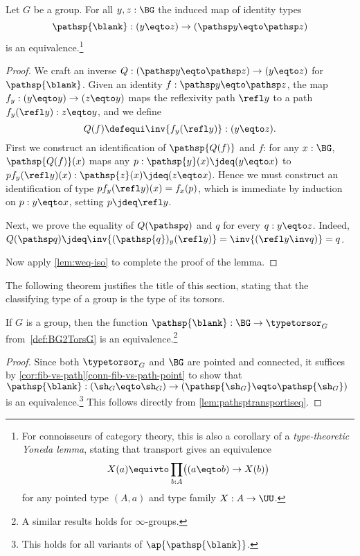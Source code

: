 \begin{lemma}\label{lem:pathsptransportiseq}
  Let $G$ be a group. For all $y,z:\BG$ the induced map of identity types
  \[
    \pathsp{\blank}:(y\eqto z)\to (\pathsp y\eqto \pathsp z)
  \]
  is an equivalence.\footnote{%
    For connoisseurs of category theory,
    this is also a corollary of a \emph{type-theoretic Yoneda lemma},
    stating that transport gives an equivalence
    \[
      X(a) \equivto \prod_{b:A}\bigl((a \eqto b) \to X(b)\bigr)
    \]
    for any pointed type $(A,a)$ and type family $X: A \to \UU$.
    }
\end{lemma}
\begin{proof}
  We craft an inverse $Q:(\pathsp y\eqto \pathsp z) \to (y\eqto z)$ for
  $\pathsp{\blank}$. Given an identity $f:\pathsp y \eqto \pathsp z$, the map
  $f_y: (y\eqto y) \to (z\eqto y)$ maps the reflexivity path $\refl y$ to a path
  $f_y(\refl y):z\eqto y$, and we define
  \[
    Q(f) \defequi \inv{f_y(\refl y)} : (y\eqto z).
  \]
  First we construct an identification of $\pathsp {Q(f)}$ and $f$:
  for any $x:\BG$, 
  $\pathsp {Q(f)}(x)$ maps any $p:\pathsp{y}(x)\jdeq(y\eqto x)$ to
  $p f_y(\refl y)(x):\pathsp{z}(x)\jdeq(z\eqto x)$. Hence we must
  construct an identification of type $p f_y(\refl y)(x)=f_x(p)$,
  which is immediate by induction on $p:y\eqto x$, setting $p\jdeq \refl y$.
  
  Next, we prove the equality of $Q(\pathsp q)$ and $q$
  for every $q:y\eqto z$. Indeed, 
  $Q(\pathsp q)\jdeq\inv{(\pathsp{q})_y(\refl y)} = \inv{(\refl y \inv q)} = q$.
  
  Now apply \cref{lem:weq-iso} to complete the proof of the lemma.
\end{proof}

The following theorem justifies the title of this section, stating 
that the classifying type of a group is the type of its torsors.

\begin{theorem}\label{lem:BGbytorsor}
  If $G$ is a group, then the function
  $\pathsp{\blank}:\BG\to\typetorsor_G$ from~\cref{def:BG2TorsG}
  is an equivalence.\footnote{A similar results holds for $\infty$-groups.}
\end{theorem}

\begin{proof}
  Since both $\typetorsor_G$ and $\BG$ are pointed and connected,
  it suffices by
  \cref{cor:fib-vs-path}\ref{conn-fib-vs-path-point} to show that 
  $\pathsp{\blank}:(\sh_G\eqto\sh_G)\to(\pathsp{\sh_G}\eqto \pathsp{\sh_G})$
  is an equivalence.\footnote{%
  This holds for all variants of $\ap{\pathsp{\blank}}$.}
  This follows directly from \cref{lem:pathsptransportiseq}.
\end{proof}

